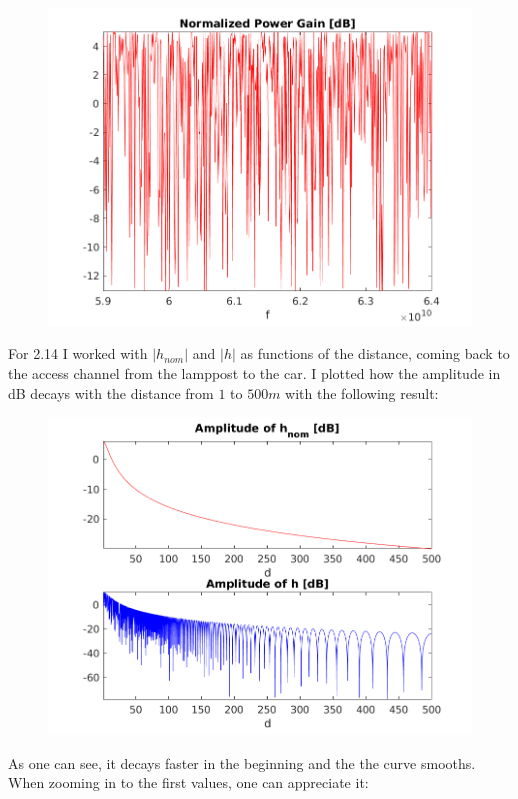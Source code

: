 \documentclass[a4paper,11pt]{article}
\begin{document}
\begin{figure}[!ht]
	\centering
	\includegraphics[scale = 0.8]{images/2_11.png}
\end{figure}

For 2.14 I worked with $|h_{nom}|$ and $|h|$ as functions of the distance, coming
back to the access channel from the lamppost to the car. I plotted how the
amplitude in dB decays with the distance from $1$ to $500m$ with the following result:

\begin{figure}[!ht]
	\centering
	\includegraphics[scale = 0.8]{images/2_14a.png}
\end{figure}

As one can see, it decays faster in the beginning and the the curve smooths. When
zooming in to the first values, one can appreciate it:
\end{document}

